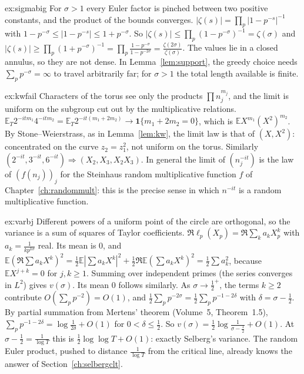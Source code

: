 \begin{solution}{ex:sigmabig}
\idea For $\sigma>1$ every Euler factor is pinched between two positive constants, and the product of the bounds converges.
\writeup $|\zeta(s)|=\prod_p|1-p^{-s}|^{-1}$ with $1-p^{-\sigma}\le|1-p^{-s}|\le1+p^{-\sigma}$. So $|\zeta(s)|\le\prod_p(1-p^{-\sigma})^{-1}=\zeta(\sigma)$ and $|\zeta(s)|\ge\prod_p(1+p^{-\sigma})^{-1}=\prod_p\frac{1-p^{-\sigma}}{1-p^{-2\sigma}}=\frac{\zeta(2\sigma)}{\zeta(\sigma)}$. The values lie in a closed annulus, so they are not dense. In Lemma~\ref{lem:support}, the greedy choice needs $\sum_pp^{-\sigma}=\infty$ to travel arbitrarily far; for $\sigma>1$ the total length available is finite.
\end{solution}

\begin{solution}{ex:kwfail}
\idea Characters of the torus see only the products $\prod n_j^{m_j}$, and the limit is uniform on the subgroup cut out by the multiplicative relations.
\writeup $\mathbb E_T2^{-itm_1}4^{-itm_2}=\mathbb E_T2^{-it(m_1+2m_2)}\to\mathbf 1\{m_1+2m_2=0\}$, which is $\mathbb EX^{m_1}(X^2)^{m_2}$. By Stone--Weierstrass, as in Lemma~\ref{lem:kw}, the limit law is that of $(X,X^2)$: concentrated on the curve $z_2=z_1^2$, not uniform on the torus. Similarly $(2^{-it},3^{-it},6^{-it})\Rightarrow(X_2,X_3,X_2X_3)$. In general the limit of $(n_j^{-it})$ is the law of $(f(n_j))_j$ for the Steinhaus random multiplicative function $f$ of Chapter~\ref{ch:randommult}: this is the precise sense in which $n^{-it}$ is a random multiplicative function.
\end{solution}

\begin{solution}{ex:varbj}
\idea Different powers of a uniform point of the circle are orthogonal, so the variance is a sum of squares of Taylor coefficients.
\writeup $\Re\ell_p(X_p)=\Re\sum_ka_kX_p^k$ with $a_k=\frac1{kp^{k\sigma}}$ real. Its mean is $0$, and $\mathbb E(\Re\sum a_kX^k)^2=\frac12\mathbb E|\sum a_kX^k|^2+\frac12\Re\mathbb E(\sum a_kX^k)^2=\frac12\sum a_k^2$, because $\mathbb EX^{j+k}=0$ for $j,k\ge1$. Summing over independent primes (the series converges in $L^2$) gives $v(\sigma)$. Its mean $0$ follows similarly. As $\sigma\to\frac12^+$, the terms $k\ge2$ contribute $O(\sum_pp^{-2})=O(1)$, and $\frac12\sum_pp^{-2\sigma}=\frac12\sum_pp^{-1-2\delta}$ with $\delta=\sigma-\frac12$. By partial summation from Mertens' theorem (Volume~5, Theorem~1.5), $\sum_pp^{-1-2\delta}=\log\frac1{2\delta}+O(1)$ for $0<\delta\le\frac12$. So $v(\sigma)=\frac12\log\frac1{\sigma-\frac12}+O(1)$. At $\sigma-\frac12=\frac1{\log T}$ this is $\frac12\log\log T+O(1)$: exactly Selberg's variance. The random Euler product, pushed to distance $\frac1{\log T}$ from the critical line, already knows the answer of Section~\ref{ch:selbergclt}.
\end{solution}

